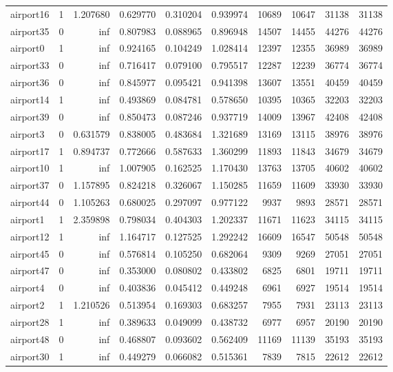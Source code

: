 \begin{longtable}{|l|r|r|r|r|r|r|r|r|r|}
airport16 & 1 & 1.207680 & 0.629770 & 0.310204 & 0.939974 & 10689 & 10647 & 31138 & 31138 \\
airport35 & 0 & inf & 0.807983 & 0.088965 & 0.896948 & 14507 & 14455 & 44276 & 44276 \\
airport0 & 1 & inf & 0.924165 & 0.104249 & 1.028414 & 12397 & 12355 & 36989 & 36989 \\
airport33 & 0 & inf & 0.716417 & 0.079100 & 0.795517 & 12287 & 12239 & 36774 & 36774 \\
airport36 & 0 & inf & 0.845977 & 0.095421 & 0.941398 & 13607 & 13551 & 40459 & 40459 \\
airport14 & 1 & inf & 0.493869 & 0.084781 & 0.578650 & 10395 & 10365 & 32203 & 32203 \\
airport39 & 0 & inf & 0.850473 & 0.087246 & 0.937719 & 14009 & 13967 & 42408 & 42408 \\
airport3 & 0 & 0.631579 & 0.838005 & 0.483684 & 1.321689 & 13169 & 13115 & 38976 & 38976 \\
airport17 & 1 & 0.894737 & 0.772666 & 0.587633 & 1.360299 & 11893 & 11843 & 34679 & 34679 \\
airport10 & 1 & inf & 1.007905 & 0.162525 & 1.170430 & 13763 & 13705 & 40602 & 40602 \\
airport37 & 0 & 1.157895 & 0.824218 & 0.326067 & 1.150285 & 11659 & 11609 & 33930 & 33930 \\
airport44 & 0 & 1.105263 & 0.680025 & 0.297097 & 0.977122 & 9937 & 9893 & 28571 & 28571 \\
airport1 & 1 & 2.359898 & 0.798034 & 0.404303 & 1.202337 & 11671 & 11623 & 34115 & 34115 \\
airport12 & 1 & inf & 1.164717 & 0.127525 & 1.292242 & 16609 & 16547 & 50548 & 50548 \\
airport45 & 0 & inf & 0.576814 & 0.105250 & 0.682064 & 9309 & 9269 & 27051 & 27051 \\
airport47 & 0 & inf & 0.353000 & 0.080802 & 0.433802 & 6825 & 6801 & 19711 & 19711 \\
airport4 & 0 & inf & 0.403836 & 0.045412 & 0.449248 & 6961 & 6927 & 19514 & 19514 \\
airport2 & 1 & 1.210526 & 0.513954 & 0.169303 & 0.683257 & 7955 & 7931 & 23113 & 23113 \\
airport28 & 1 & inf & 0.389633 & 0.049099 & 0.438732 & 6977 & 6957 & 20190 & 20190 \\
airport48 & 0 & inf & 0.468807 & 0.093602 & 0.562409 & 11169 & 11139 & 35193 & 35193 \\
airport30 & 1 & inf & 0.449279 & 0.066082 & 0.515361 & 7839 & 7815 & 22612 & 22612 \\

\end{longtable}

